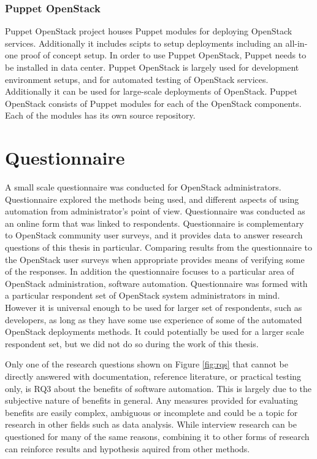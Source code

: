 \subsection{Puppet OpenStack}

Puppet OpenStack project houses Puppet \cite{puppet-deployment-guide} modules
for deploying OpenStack services. Additionally it includes scipts to setup
deployments including an all-in-one proof of concept setup. In order to use
Puppet OpenStack, Puppet needs to be installed in data center. Puppet OpenStack
is largely used for development environment setups, and for automated testing
of OpenStack services. Additionally it can be used for large-scale deployments
of OpenStack. Puppet OpenStack consists of Puppet modules for each of the
OpenStack components. Each of the modules has its own source repository.

\chapter{Questionnaire} \label{questionnaire}

A small scale questionnaire was conducted for OpenStack administrators.
Questionnaire explored the methods being used, and different aspects of using
automation from administrator's point of view. Questionnaire was conducted as
an online form that was linked to respondents. Questionnaire is complementary
to OpenStack community user surveys, and it provides data to answer research
questions of this thesis in particular. Comparing results from the
questionnaire to the OpenStack user surveys when appropriate provides means of
verifying some of the responses. In addition the questionnaire focuses to a
particular area of OpenStack administration, software automation. Questionnaire
was formed with a particular respondent set of OpenStack system administrators
in mind. However it is universal enough to be used for larger set of
respondents, such as developers, as long as they have some use experience of
some of the automated OpenStack deployments methods. It could potentially be
used for a larger scale respondent set, but we did not do so during the work of
this thesis.

Only one of the research questions shown on Figure \ref{fig:rqs} that cannot be
directly answered with documentation, reference literature, or practical
testing only, is RQ3 about the benefits of software automation. This is largely
due to the subjective nature of benefits in general. Any measures provided for
evaluating benefits are easily complex, ambiguous or incomplete and could be a
topic for research in other fields such as data analysis. While interview
research can be questioned for many of the same reasons, combining it to other
forms of research can reinforce results and hypothesis aquired from other
methods.

